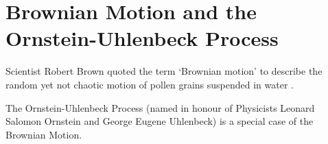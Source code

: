 \section{Brownian Motion and the Ornstein-Uhlenbeck Process}
Scientist Robert Brown quoted the term `Brownian motion' to describe the random yet not chaotic motion of pollen grains suspended in water \cite{brownianMotion}.

The Ornstein-Uhlenbeck Process (named in honour of Physicists Leonard Salomon Ornstein and George Eugene Uhlenbeck) is a special case of the Brownian Motion.  